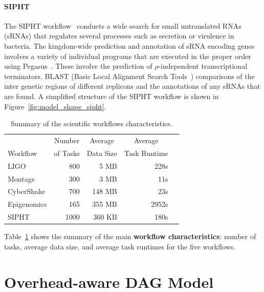 \paragraph{\textbf{SIPHT}}
The SIPHT workflow~\cite{SIPHT} conducts a wide search for small untranslated RNAs (sRNAs) that regulates several processes such as secretion or virulence in bacteria. The kingdom-wide prediction and annotation of sRNA encoding genes involves a variety of individual programs that are executed in the proper order using Pegasus~\cite{Deelman2004}. These involve the prediction of $\rho$-independent transcriptional terminators, BLAST (Basic Local Alignment Search Tools~\cite{BLAST}) comparisons of the inter genetic regions of different replicons and the annotations of any sRNAs that are found. A simplified structure of the SIPHT workflow is shown in Figure~\ref{fig:model_shape_sipht}. 




\begin{table}[!htb]
	\setlength{\tabcolsep}{11pt}
	\centering
	\small
	\begin{tabular}{lrrrr}
		\hline
		 & \multicolumn{1}{c}{Number} & \multicolumn{1}{c}{Average} &  \multicolumn{1}{c}{Average} \\
		Workflow	& of Tasks	 & Data Size & Task Runtime \\
		\hline
		LIGO 		&800		& 5 MB	& 228s\\
		Montage 		&300		&3 MB	&11s\\
		CyberShake 	&700		&148 MB 	& 23s\\
		Epigenomics 	&165 	& 355 MB	& 2952s\\
		SIPHT		&1000	& 360 KB 	& 180s\\
		\hline
	\end{tabular}
	\caption{Summary of the scientific workflows characteristics.}
	\label{tab:model_workflows}
\end{table} 

Table~\ref{tab:model_workflows} shows the summary of the main \textbf{workflow characteristics}: number of tasks, average data size, and average task runtimes for the five workflows. 

\section{Overhead-aware DAG Model}

